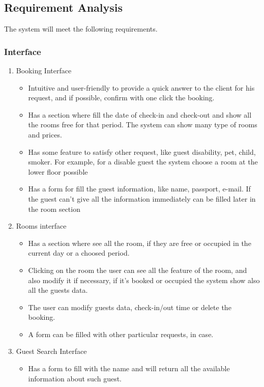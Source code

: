 \subsection{Requirement Analysis}

The system will meet the following requirements.

\subsubsection{Interface}

\begin{enumerate}
	
\item Booking Interface
    \begin{itemize}
		\item Intuitive and user-friendly to provide a quick answer to the client for his request, and if possible, confirm with one click the booking.
		\item Has a section where fill the date of check-in and check-out and show all the rooms free for that period. The system can show many type of rooms and prices.
		\item Has some feature to satisfy other request, like guest disability, pet, child, smoker. For example, for a disable guest the system choose a room at the lower floor possible
		\item Has a form for fill the guest information, like name, passport, e-mail. If the guest can't give all the information immediately can be filled later in the room section
    \end{itemize}
	
\item Rooms interface
    \begin{itemize}
		\item Has a section where see all the room, if they are free or occupied in the current day or a choosed period.
		\item Clicking on the room the user can see all the feature of the room, and also modify it if necessary, if it's booked or occupied the system show also all the guests data.
		\item The user can modify guests data, check-in/out time or delete the booking. 
		\item A form can be filled with other particular requests, in case.
    \end{itemize}
    
\item Guest Search Interface
	\begin{itemize}
		\item Has a form to fill with the name and will return all the available information about such guest. 
	\end{itemize}


\end{enumerate}
